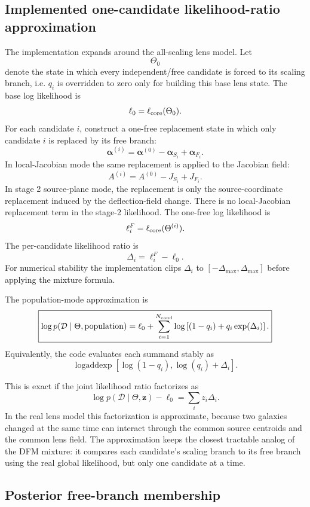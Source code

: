 \documentclass[11pt]{article}
\newcommand{\data}{\mathcal{D}}
\begin{document}
\subsection{Implemented one-candidate likelihood-ratio approximation}

The implementation expands around the all-scaling lens model. Let
\[
    \Theta_0
\]
denote the state in which every independent/free candidate is forced to its
scaling branch, i.e. $q_i$ is overridden to zero only for building this base
lens state. The base log likelihood is
\[
    \ell_0
    =
    \ell_{\rm core}(\Theta_0).
\]
For each candidate $i$, construct a one-free replacement state in which only
candidate $i$ is replaced by its free branch:
\[
    \bm{\alpha}^{(i)}
    =
    \bm{\alpha}^{(0)}
    -
    \bm{\alpha}_{S_i}
    +
    \bm{\alpha}_{F_i}.
\]
In local-Jacobian mode the same replacement is applied to the Jacobian field:
\[
    A^{(i)}
    =
    A^{(0)}
    -
    J_{S_i}
    +
    J_{F_i}.
\]
In stage 2 source-plane mode, the replacement is only the source-coordinate
replacement induced by the deflection-field change. There is no local-Jacobian
replacement term in the stage-2 likelihood.
The one-free log likelihood is
\[
    \ell_i^{F}
    =
    \ell_{\rm core}(\Theta^{(i)}).
\]
The per-candidate likelihood ratio is
\[
    \Delta_i
    =
    \ell_i^{F}-\ell_0.
\]
For numerical stability the implementation clips $\Delta_i$ to
$[-\Delta_{\max},\Delta_{\max}]$ before applying the mixture formula.

The population-mode approximation is
\[
    \boxed{
    \log p(\data\mid\Theta,{\rm population})
    =
    \ell_0
    +
    \sum_{i=1}^{N_{\rm cand}}
    \log\left[
        (1-q_i)
        +
        q_i \exp(\Delta_i)
    \right].
    }
\]
Equivalently, the code evaluates each summand stably as
\[
    \operatorname{logaddexp}
    \left[
        \log(1-q_i),
        \log(q_i)+\Delta_i
    \right].
\]

This is exact if the joint likelihood ratio factorizes as
\[
    \log p(\data\mid\Theta,\bm{z})-\ell_0
    =
    \sum_i z_i\Delta_i.
\]
In the real lens model this factorization is approximate, because two galaxies
changed at the same time can interact through the common source centroids and
the common lens field. The approximation keeps the closest tractable analog of
the DFM mixture: it compares each candidate's scaling branch to its free branch
using the real global likelihood, but only one candidate at a time.

\subsection{Posterior free-branch membership}
\end{document}
